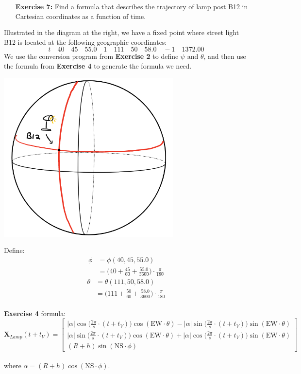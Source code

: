 \documentclass[11pt]{article}
\theoremstyle{definition}
\newcommand{\1}[1]{\mathbf{1} \left \{ #1 \right \}}
\begin{document}
\begin{itemize}
\item[{\textbf{Exercise 7:}}] Find a formula that describes the trajectory of lamp post B12 in Cartesian coordinates as a function of time.
\end{itemize}
\begin{minipage}{0.6\linewidth}
Illustrated in the diagram at the right, we have a fixed point where street light B12 is located at the following geographic coordinates:
\[t \quad 40 \quad 45 \quad 55.0 \quad 1 \quad 111 \quad 50 \quad 58.0 \quad -1 \quad 1372.00\]
We use the conversion program from \textbf{Exercise 2} to define $\psi$ and $\theta$, and then use the formula from \textbf{Exercise 4} to generate the formula we need.
\end{minipage} \qquad
\begin{minipage}{0.4\linewidth}
\includegraphics[width=0.2\textheight]{Images/M5600_7_light.PNG}
\end{minipage}
Define:
\begin{align*}
    \phi &= \phi(40, 45, 55.0) \\
    &= \bigg(40 + \frac{45}{60} + \frac{55.0}{3600}\bigg) \cdot \frac{\pi}{180}
\end{align*}
\begin{align*}
    \theta &= \theta(111, 50, 58.0) \\
    &= \bigg(111 + \frac{50}{60} + \frac{58.0}{3600}\bigg) \cdot \frac{\pi}{180}
\end{align*}
\\
\textbf{Exercise 4} formula:
\[\textbf{X}_{Lamp}(t+t_V) = \begin{bmatrix}
|\alpha| \cos \big(\frac{2\pi}{s} \cdot (t+t_V) \big) \cos (\textrm{EW} \cdot \theta) - |\alpha| \sin \big(\frac{2\pi}{s} \cdot (t+t_V) \big) \sin (\textrm{EW} \cdot \theta) \\
|\alpha| \sin \big(\frac{2\pi}{s} \cdot (t+t_V) \big) \cos (\textrm{EW} \cdot \theta) + |\alpha| \cos \big(\frac{2\pi}{s} \cdot (t+t_V) \big) \sin (\textrm{EW} \cdot \theta) \\
(R + h) \sin (\textrm{NS} \cdot \phi)
\end{bmatrix}\] \\
where \(\alpha = (R + h) \cos (\textrm{NS} \cdot \phi)\).
\end{document}
